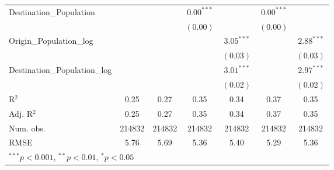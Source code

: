 \begin{table}
\begin{center}
\begin{tabular}{l c c c c c c }
			Destination\_Population      &               &               & $0.00^{***}$  &                & $0.00^{***}$  &                \\
			&               &               & $(0.00)$      &                & $(0.00)$      &                \\
			Origin\_Population\_log      &               &               &               & $3.05^{***}$   &               & $2.88^{***}$   \\
			&               &               &               & $(0.03)$       &               & $(0.03)$       \\
			Destination\_Population\_log &               &               &               & $3.01^{***}$   &               & $2.97^{***}$   \\
			&               &               &               & $(0.02)$       &               & $(0.02)$       \\
			\hline
			R$^2$                        & 0.25          & 0.27          & 0.35          & 0.34           & 0.37          & 0.35           \\
			Adj. R$^2$                   & 0.25          & 0.27          & 0.35          & 0.34           & 0.37          & 0.35           \\
			Num. obs.                    & 214832        & 214832        & 214832        & 214832         & 214832        & 214832         \\
			RMSE                         & 5.76          & 5.69          & 5.36          & 5.40           & 5.29          & 5.36           \\
			\hline
			\multicolumn{7}{l}{\scriptsize{$^{***}p<0.001$, $^{**}p<0.01$, $^*p<0.05$}}
		\end{tabular}
		\label{table:GravityModel2018Q2}
	\end{center}
\end{table}

